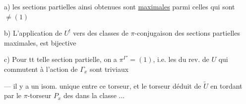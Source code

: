  a)  les sections partielles ainsi obtenues sont \uline{maximales} parmi celles qui sont $\ne(1)$

 b) L'application de $U^!$ vers  des classes de $\pi$-conjugaison des sections partielles   maximales, est bijective


 c) Pour tt telle section partielle, on a $\pi^{\Gamma'}=(1)$, i.e. les   du rev.   de $U$ qui commutent à l'action de $\Gamma_x$ sont triviaux

--- il y a un isom. unique  entre ce torseur, et le torseur déduit de $\widetilde U$ en tordant par le $\pi$-torseur  $P_x$ des  dans la classe  \unsure{$[\Gamma']$}...

